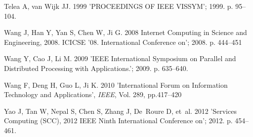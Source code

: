 \documentclass{doublecol-new}
\def\newblock{\hskip .11em plus .33em minus .07em}
\theoremstyle{TH}{
\newtheorem{lemma}{Lemma}
\newtheorem{theorem}[lemma]{Theorem}
\newtheorem{corrolary}[lemma]{Corrolary}
\newtheorem{conjecture}[lemma]{Conjecture}
\newtheorem{proposition}[lemma]{Proposition}
\newtheorem{claim}[lemma]{Claim}
\newtheorem{stheorem}[lemma]{Wrong Theorem}
\newtheorem{algorithm}{Algorithm}
}
\theoremstyle{THrm}{
\newtheorem{definition}{Definition}[section]
\newtheorem{question}{Question}[section]
\newtheorem{remark}{Remark}
\newtheorem{scheme}{Scheme}
}
\theoremstyle{THhit}{
\newtheorem{case}{Case}[section]
}
\begin{document}
\begin{thebibliography}{10}
Telea A, van Wijk JJ. {1999} 'PROCEEDINGS OF IEEE VISSYM'; 1999. p. 95--104.


Wang J, Han Y, Yan S, Chen W, Ji G. {2008} Internet Computing in Science and Engineering, 2008. ICICSE '08.
International Conference on'; 2008. p. 444--451


Wang Y, Cao J, Li M. {2009} 'IEEE International Symposium on Parallel and Distributed
Processing with Applications.'; 2009. p. 635--640.


Wang F, Deng H, Guo L, Ji K. {2010} 'International Forum on Information Technology and
Applications', {\it IEEE}, Vol. 289, pp.417--420


Yao J, Tan W, Nepal S, Chen S, Zhang J, De~Roure D, et~al. {2012} 'Services Computing (SCC), 2012 IEEE Ninth International
Conference on'; 2012. p. 454--461.



\end{thebibliography}
\end{document}
